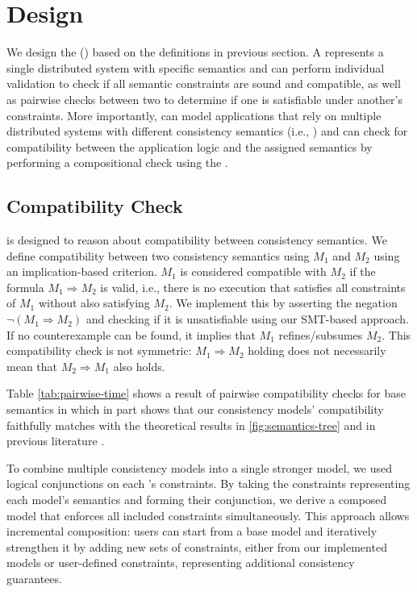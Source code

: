 \section{\sysname{} Design}

We design the \sysmodlong{} (\sysmod{}) based on the definitions in
previous section.
A \sysmod{} represents a single distributed system with specific semantics
and \sysname{} can perform individual \sysmod{} validation to check if all
semantic constraints are sound and compatible, as
well as pairwise checks between two \sysmods{} to determine if one
is satisfiable under another's constraints.
More importantly, \sysname{} can model applications that rely on multiple
distributed systems with different
consistency semantics (i.e., \sysmods{}) and can check for compatibility
between the application logic and the assigned semantics by performing a
compositional check using the \sysgraph{}.

\subsection{Compatibility Check}

\sysname{} is designed to reason about
compatibility between consistency semantics.
We define compatibility between two consistency semantics using \sysmods{}
$M_1$ and $M_2$ using
an implication-based criterion. $M_1$ is considered compatible with
$M_2$ if the formula $M_1 \Rightarrow M_2$ is valid, i.e., there is no
execution that satisfies all constraints of $M_1$ without also
satisfying $M_2$.
We implement this by asserting the negation $\neg (M_1 \Rightarrow M_2)$ and
checking if it is unsatisfiable using our SMT-based approach. If no
counterexample can be found, it implies that $M_1$
refines/subsumes $M_2$. This compatibility check is not symmetric:
$M_1 \Rightarrow M_2$
holding does not necessarily mean that $M_2 \Rightarrow M_1$ also holds.

Table \ref{tab:pairwise-time} shows a result of pairwise
compatibility checks for
base semantics in \sysname{} which in part shows that our consistency
models' compatibility faithfully matches with the theoretical results
in \cref{fig:semantics-tree} and in previous literature \cite{terry1994session}.

To combine multiple consistency models into a single stronger model, we used
logical conjunctions on each \sysmod{}'s constraints. By taking the constraints
representing each model's semantics and forming their conjunction, we derive a
composed model that enforces all included constraints simultaneously.
This approach allows incremental composition: users can start from a
base model and iteratively strengthen it by adding new sets of constraints,
either from our implemented models or user-defined constraints, representing
additional consistency guarantees.

